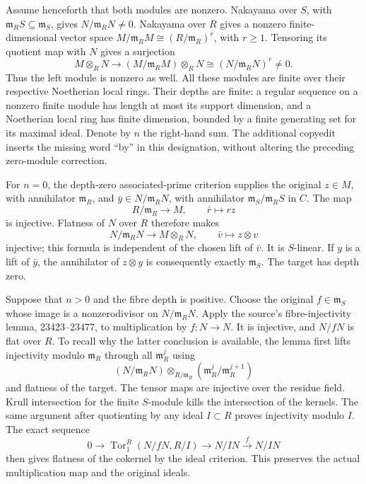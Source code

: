 Assume henceforth that both modules are nonzero. Nakayama over \(S\), with \(\mathfrak m_RS\subseteq\mathfrak m_S\), gives \(N/\mathfrak m_RN\ne0\). Nakayama over \(R\) gives a nonzero finite-dimensional vector space \(M/\mathfrak m_RM\cong (R/\mathfrak m_R)^r\), with \(r\ge1\). Tensoring its quotient map with \(N\) gives a surjection \[
 M\otimes_RN\longrightarrow
 (M/\mathfrak m_RM)\otimes_RN
 \cong (N/\mathfrak m_RN)^r\ne0.
\] Thus the left module is nonzero as well. All these modules are finite over their respective Noetherian local rings. Their depths are finite: a regular sequence on a nonzero finite module has length at most its support dimension, and a Noetherian local ring has finite dimension, bounded by a finite generating set for its maximal ideal. Denote by \(n\) the right-hand sum. The additional copyedit inserts the missing word ``by'' in this designation, without altering the preceding zero-module correction.

For \(n=0\), the depth-zero associated-prime criterion supplies the original \(z\in M\), with annihilator \(\mathfrak m_R\), and \(\bar y\in N/\mathfrak m_RN\), with annihilator \(\mathfrak m_S/\mathfrak m_RS\) in \(C\). The map \[
 R/\mathfrak m_R\longrightarrow M,\qquad \bar r\longmapsto rz
\] is injective. Flatness of \(N\) over \(R\) therefore makes \[
 N/\mathfrak m_RN\longrightarrow M\otimes_RN,
 \qquad \bar v\longmapsto z\otimes v
\] injective; this formula is independent of the chosen lift of \(\bar v\). It is \(S\)-linear. If \(y\) is a lift of \(\bar y\), the annihilator of \(z\otimes y\) is consequently exactly \(\mathfrak m_S\). The target has depth zero.

Suppose that \(n>0\) and the fibre depth is positive. Choose the original \(f\in\mathfrak m_S\) whose image is a nonzerodivisor on \(N/\mathfrak m_RN\). Apply the source's fibre-injectivity lemma, 23423--23477, to multiplication by \(f:N\to N\). It is injective, and \(N/fN\) is flat over \(R\). To recall why the latter conclusion is available, the lemma first lifts injectivity modulo \(\mathfrak m_R\) through all \(\mathfrak m_R^j\) using \[
 (N/\mathfrak m_RN)\otimes_{R/\mathfrak m_R}
 (\mathfrak m_R^j/\mathfrak m_R^{j+1})
\] and flatness of the target. The tensor maps are injective over the residue field. Krull intersection for the finite \(S\)-module kills the intersection of the kernels. The same argument after quotienting by any ideal \(I\subset R\) proves injectivity modulo \(I\). The exact sequence \[
 0\to\operatorname{Tor}_1^R(N/fN,R/I)
 \to N/IN\xrightarrow{f}N/IN
\] then gives flatness of the cokernel by the ideal criterion. This preserves the actual multiplication map and the original ideals.


